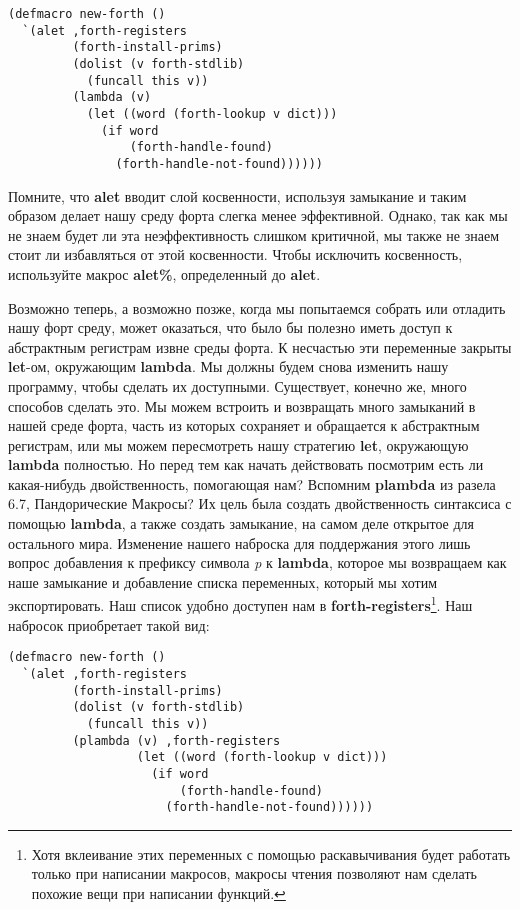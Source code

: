 \begin{verbatim}
(defmacro new-forth ()
  `(alet ,forth-registers
         (forth-install-prims)
         (dolist (v forth-stdlib)
           (funcall this v))
         (lambda (v)
           (let ((word (forth-lookup v dict)))
             (if word
                 (forth-handle-found)
               (forth-handle-not-found))))))
\end{verbatim}

Помните, что \textbf{alet} вводит слой косвенности, используя замыкание и таким образом делает нашу среду форта слегка менее эффективной. Однако, так как мы не знаем будет ли эта неэффективность слишком критичной, мы также не знаем стоит ли избавляться от этой косвенности. Чтобы исключить косвенность, используйте макрос \textbf{alet\%}, определенный до \textbf{alet}.

Возможно теперь, а возможно позже, когда мы попытаемся собрать или отладить нашу форт среду, может оказаться, что было бы полезно иметь доступ к абстрактным регистрам извне среды форта. К несчастью эти переменные закрыты \textbf{let}-ом, окружающим \textbf{lambda}. Мы должны будем снова изменить нашу программу, чтобы сделать их доступными. Существует, конечно же, много способов сделать это. Мы можем встроить и возвращать много замыканий в нашей среде форта, часть из которых сохраняет и обращается к абстрактным регистрам, или мы можем пересмотреть нашу стратегию \textbf{let}, окружающую \textbf{lambda} полностью. Но перед тем как начать действовать посмотрим есть ли какая-нибудь двойственность, помогающая нам? Вспомним \textbf{plambda} из разела 6.7, Пандорические Макросы? Их цель была создать двойственность синтаксиса с помощью \textbf{lambda}, а также создать замыкание, на самом деле открытое для остального мира. Изменение нашего наброска для поддержания этого лишь вопрос добавления к префиксу символа \emph{p} к \textbf{lambda}, которое мы возвращаем как наше замыкание и добавление списка переменных, который мы хотим экспортировать. Наш список удобно доступен нам в \textbf{forth-registers}\footnote{Хотя вклеивание этих переменных с помощью раскавычивания будет работать только при написании макросов, макросы чтения позволяют нам сделать похожие вещи при написании функций.}. Наш набросок приобретает такой вид:

\begin{verbatim}
(defmacro new-forth ()
  `(alet ,forth-registers
         (forth-install-prims)
         (dolist (v forth-stdlib)
           (funcall this v))
         (plambda (v) ,forth-registers
                  (let ((word (forth-lookup v dict)))
                    (if word
                        (forth-handle-found)
                      (forth-handle-not-found))))))
\end{verbatim}

